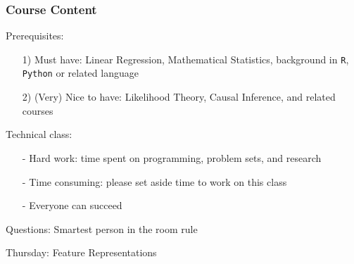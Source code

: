 \documentclass{beamer}
\numberwithin{equation}{section}
\begin{document}
\begin{frame}
\frametitle{Course Content}

Prerequisites:
\begin{itemize}
\item[1)] Must have: Linear Regression, Mathematical Statistics, background in {\tt R}, {\tt Python} or related language
\item[2)] (Very) Nice to have: Likelihood Theory, Causal Inference, and related courses
\end{itemize}  

Technical class:
\begin{itemize}
\item[-] Hard work: time spent on programming, problem sets, and research
\item[-] Time consuming: please set aside time to work on this class
\item[-] \alert{Everyone can succeed}
\end{itemize}  

Questions: Smartest person in the room rule



\end{frame}


\begin{frame}
\huge

Thursday: Feature Representations


\end{frame}
\end{document}
